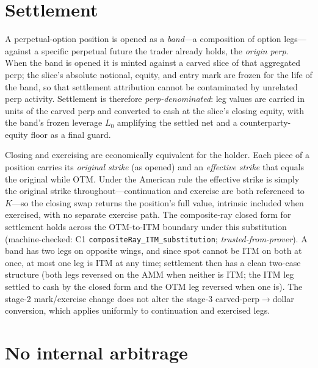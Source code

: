 \documentclass[11pt]{article}
\newcommand{\tfp}{\emph{trusted-from-prover}}
\begin{document}
\section{Settlement}\label{sec:settlement}

A perpetual-option position is opened as a \emph{band}---a composition of option
legs---against a specific perpetual future the trader already holds, the
\emph{origin perp}. When the band is opened it is minted against a carved slice of
that aggregated perp; the slice's absolute notional, equity, and entry mark are
frozen for the life of the band, so that settlement attribution cannot be
contaminated by unrelated perp activity. Settlement is therefore
\emph{perp-denominated}: leg values are carried in units of the carved perp and
converted to cash at the slice's closing equity, with the band's frozen leverage
$L_{0}$ amplifying the settled net and a counterparty-equity floor as a final
guard.

Closing and exercising are economically equivalent for the holder. Each piece of
a position carries its \emph{original strike} (as opened) and an \emph{effective
strike} that equals the original while OTM. Under the American rule the effective
strike is simply the original strike throughout---continuation and exercise are
both referenced to $K$---so the closing swap returns the position's full value,
intrinsic included when exercised, with no separate exercise path. The
composite-ray closed form for settlement holds across the OTM-to-ITM boundary
under this substitution (machine-checked: C1
\texttt{compositeRay\_ITM\_substitution}; \tfp{}). A band has two legs on opposite
wings, and since spot cannot be ITM on both at once, at most one leg is ITM at any
time; settlement then has a clean two-case structure (both legs reversed on the
AMM when neither is ITM; the ITM leg settled to cash by the closed form and the
OTM leg reversed when one is). The stage-2 mark/exercise change does not alter the
stage-3 carved-perp$\to$dollar conversion, which applies uniformly to continuation
and exercised legs.

\section{No internal arbitrage}\label{sec:noarb}
\end{document}
